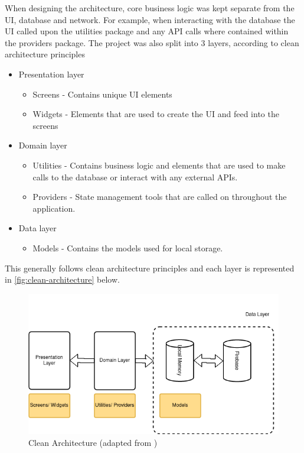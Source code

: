 \documentclass[12pt]{article}
\begin{document}
	When designing the architecture, core business logic was kept separate from the UI, database and network. For example, when interacting with the database the UI called upon the utilities package and any API calls where contained within the providers package. The project was also split into 3 layers, according to clean architecture principles \cite{martinRapidApplicationDevelopment1991}
	
	\begin{itemize}
		\item Presentation layer
		\begin{itemize}
			\item Screens - Contains unique UI elements
			\item Widgets - Elements that are used to create the UI and feed into the screens
		\end{itemize}
	\end{itemize}
	
	\begin{itemize}
		\item Domain layer
		\begin{itemize}
			\item Utilities - Contains business logic and elements that are used to make calls to the database or interact with any external APIs.
			\item Providers - State management tools that are called on throughout the application.
		\end{itemize}
	\end{itemize}
	
	\begin{itemize}
		\item Data layer
		\begin{itemize}
			\item Models - Contains the models used for local storage.
		\end{itemize}
	\end{itemize}

	 This generally follows clean architecture principles \cite{martinRapidApplicationDevelopment1991} and each layer is represented in \autoref{fig:clean-architecture} below.
	 
	 \begin{figure}[H]
	 	\centering
	 	\includegraphics[scale=0.7]{images/clean-architecture.png}
	 	\caption{Clean Architecture (adapted from \cite{martinRapidApplicationDevelopment1991})}
	 	\label{fig:clean-architecture}
	 \end{figure}
 
\end{document}
